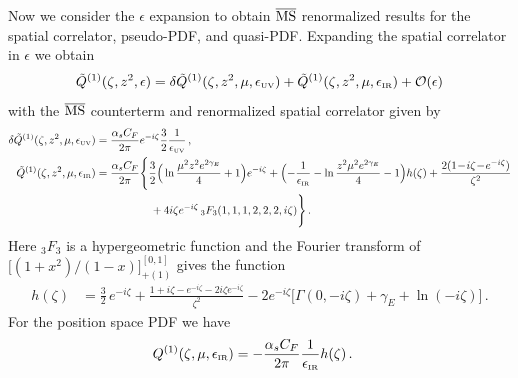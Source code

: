 \documentclass[prd,aps,twocolumn,preprintnumbers,showpacs,nofootinbib,superscriptaddress,notitlepage]{revtex4-1}
\newcommand{\nn}{\nonumber}
\newcommand{\spcorr}{spatial correlator\xspace}
\begin{document}
\begin{widetext}
Now we consider the $\epsilon$ expansion to obtain $\overline{\rm MS}$ renormalized results for the \spcorr, pseudo-PDF, and quasi-PDF. Expanding the \spcorr in $\epsilon$ we obtain
\begin{align}
 \tilde{Q}^{(1)}(\zeta,z^2,\epsilon)=\delta \tilde{Q}^{(1)}(\zeta,z^2,\mu,\epsilon_{\mbox{\tiny UV}})+\tilde{Q}^{(1)}(\zeta,z^2,\mu,\epsilon_{\mbox{\tiny IR}})+{\cal O}(\epsilon)
\end{align}
with the $\overline{\rm MS}$ counterterm and renormalized \spcorr given by
\begin{align} \label{eq:1loopiofferen}
\delta \tilde{Q}^{(1)}(\zeta,z^2,\mu,\epsilon_{\mbox{\tiny UV}})
&= {\alpha_sC_F\over 2\pi}
  e^{-i\zeta} {3\over2}  {1\over \epsilon_{\mbox{\tiny UV}}}
 \,, \\
\tilde{Q}^{(1)}(\zeta,z^2,\mu,\epsilon_{\mbox{\tiny IR}})
&= {\alpha_sC_F\over 2\pi} \Bigg\{
  \frac{3}{2} \Big(\ln{\mu^2 z^2 e^{2\gamma_E} \over 4} +1\Big) e^{-i\zeta}
  + \Bigl( -\frac{1}{ \epsilon_{\mbox{\tiny IR}} } - \ln\frac{z^2\mu^2e^{2\gamma_E}}{4} - 1 \Bigr) h(\zeta)
  + \frac{2(1 \!-\!i\zeta\!-\! e^{-i\zeta})}{\zeta^2}
  \nn\\
&\qquad\qquad\quad
  + 4 i \zeta e^{-i\zeta}\, {}_3F_3(1,1,1,2,2,2,i\zeta)
  \Bigg\}
  \,. \nn
\end{align}
Here ${}_3F_3$ is a hypergeometric function and the Fourier transform of $\big[(1+x^2)/(1-x)\big]_{+(1)}^{[0,1]}$ gives the function
\begin{align}
  h(\zeta) &=\frac{3}{2}\, e^{-i\zeta}
  + \frac{1+i\zeta-e^{-i\zeta}-2i\zeta e^{-i\zeta}}{\zeta^2}
  - 2 e^{-i\zeta} \big[ \Gamma(0,-i\zeta)\!+\!\gamma_E\!+\!\ln(-i\zeta) \big]
  \,.
\end{align}
For the position space PDF we have
\begin{align}
  Q^{(1)}(\zeta,\mu,\epsilon_{\mbox{\tiny IR}})
  &= -  {\alpha_sC_F\over 2\pi}  \frac{1}{  \epsilon_{\mbox{\tiny IR}} }  h(\zeta) \,.
\end{align}


\end{widetext}
\end{document}
